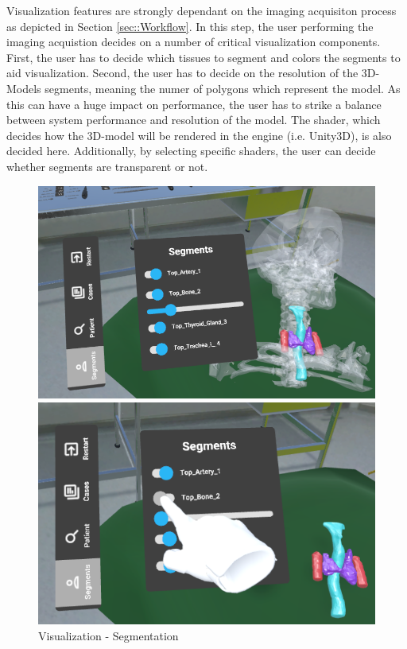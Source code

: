Visualization features are strongly dependant on the imaging acquisiton process as depicted in Section \ref{sec::Workflow}.
In this step, the user performing the imaging acquistion decides on a number of critical visualization components.
First, the user has to decide which tissues to segment and colors the segments to aid visualization.
Second, the user has to decide on the resolution of the 3D-Models segments, meaning the numer of polygons which represent the model.
As this can have a huge impact on performance, the user has to strike a balance between system performance and resolution of the model.
The shader, which decides how the 3D-model will be rendered in the engine (i.e. Unity3D), is also decided here.
Additionally, by selecting specific shaders, the user can decide whether segments are transparent or not.
\begin{figure}[ht]
  \centering
  \begin{minipage}{.5\textwidth}
    \centering
    \includegraphics[width=0.95\linewidth]{images/implementation/features/visualization/segments_1.png}
  \end{minipage}%
  \begin{minipage}{.5\textwidth}
    \centering
    \includegraphics[width=0.915\linewidth]{images/implementation/features/visualization/segments_2.png}
  \end{minipage}
  \caption{\label{fig::Segmentation}Visualization - Segmentation}
\end{figure}

